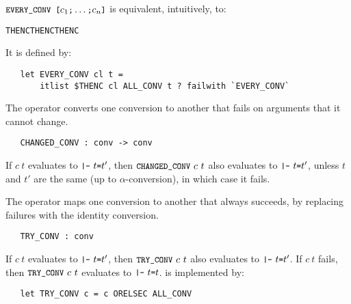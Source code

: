 \noindent $\ml{EVERY\_CONV [}c_1\ml{;}\ldots\ml{;}c_n\ml{]}$ is equivalent,
intuitively, to:

\begin{hol}
\begin{alltt}
    THENC  THENC \m{\ldots} THENC 
\end{alltt}\end{hol}

\noindent It is defined by:

\begin{hol}\begin{verbatim}
   let EVERY_CONV cl t = 
       itlist $THENC cl ALL_CONV t ? failwith `EVERY_CONV`
\end{verbatim}\end{hol}

The operator  converts one conversion to another that
fails on arguments that it cannot change.

\begin{boxed}
\begin{verbatim}
   CHANGED_CONV : conv -> conv
\end{verbatim}\end{boxed}

\noindent If $c\ t$ evaluates to $\ml{|-}\ t\ml{=}t'$, then
$\ml{CHANGED\_CONV}\ c\ t$  also evaluates to $\ml{|-}\ t\ml{=}t'$,
unless $t$ and $t'$ are the same (up to $\alpha$-conversion),
in which case it fails.

The operator  maps one conversion to another that
always succeeds, by replacing failures with the identity conversion.

\begin{boxed}
\begin{verbatim}
   TRY_CONV : conv
\end{verbatim}\end{boxed}

\noindent If $c\ t$ evaluates to $\ml{|-}\ t\ml{=}t'$, then
$\ml{TRY\_CONV}\ c\ t$  also evaluates to $\ml{|-}\ t\ml{=}t'$. If
$c\ t$ fails, then $\ml{TRY\_CONV}\ c\ t$ evaluates
to  $\ml{|-}\ t\ml{=}t$.  is implemented by:

\begin{hol}\begin{verbatim}
   let TRY_CONV c = c ORELSEC ALL_CONV
\end{verbatim}\end{hol}

